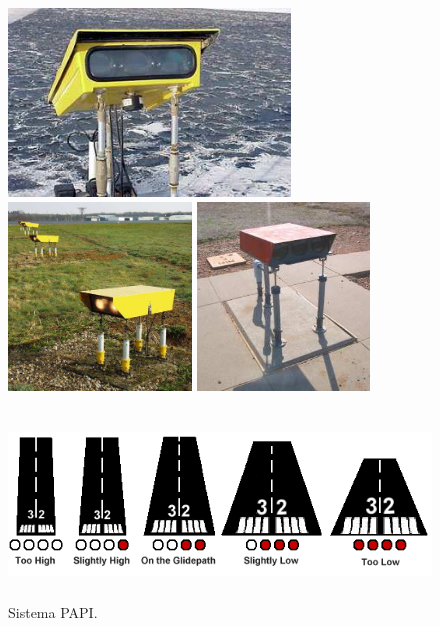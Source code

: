 \begin{figure}[!h]
  \centering
  \includegraphics[height= 5cm]{06.radionavegacion/Imagenes/06.PAPI/PAPI001.png}
  \includegraphics[height= 5cm]{06.radionavegacion/Imagenes/06.PAPI/PAPI002.png}
  \includegraphics[height= 5cm]{06.radionavegacion/Imagenes/06.PAPI/PAPI003.png}

  \includegraphics[height= 5cm]{06.radionavegacion/Imagenes/06.PAPI/PAPI004.png}    
  \caption{Sistema PAPI.}
  \label{fig:06.Sistemas.Aproximacion.PAPI}
\end{figure}

